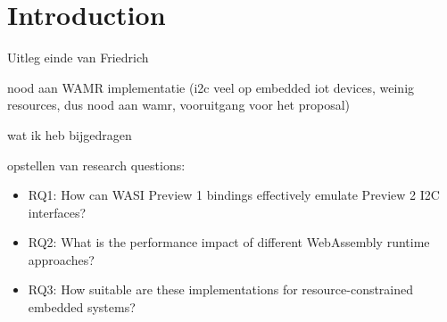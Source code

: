 \chapter{Introduction}
\label{chap:1}

Uitleg einde van Friedrich

nood aan WAMR implementatie (i2c veel op embedded iot devices, weinig resources, dus nood aan wamr, vooruitgang voor het proposal)

wat ik heb bijgedragen

opstellen van research questions:
\begin{itemize}
    \item RQ1: How can WASI Preview 1 bindings effectively emulate Preview 2 I2C interfaces?
    \item RQ2: What is the performance impact of different WebAssembly runtime approaches?
    \item RQ3: How suitable are these implementations for resource-constrained embedded systems?
\end{itemize}